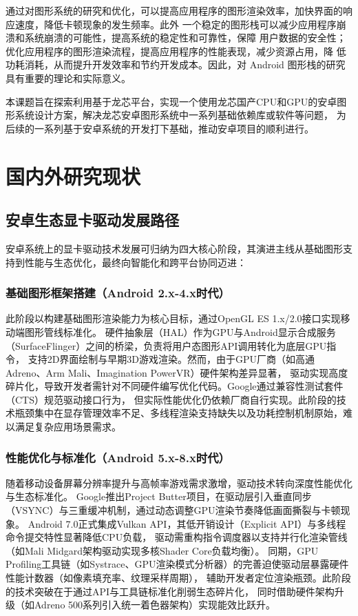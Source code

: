 通过对图形系统的研究和优化，可以提高应用程序的图形渲染效率，加快界面的响应速度，降低卡顿现象的发生频率。此外
一个稳定的图形栈可以减少应用程序崩溃和系统崩溃的可能性，提高系统的稳定性和可靠性，保障
用户数据的安全性；优化应用程序的图形渲染流程，提高应用程序的性能表现，减少资源占用，降
低功耗消耗，从而提升开发效率和节约开发成本。因此，对 Android 图形栈的研究具有重要的理论和实际意义。

本课题旨在探索利用基于龙芯平台，实现一个使用龙芯国产CPU和GPU的安卓图形系统设计方案，解决龙芯安卓图形系统中一系列基础依赖库或软件等问题，
为后续的一系列基于安卓系统的开发打下基础，推动安卓项目的顺利进行。

\section{国内外研究现状}

\subsection{安卓生态显卡驱动发展路径}
安卓系统上的显卡驱动技术发展可归纳为四大核心阶段，其演进主线从基础图形支持到性能与生态优化，最终向智能化和跨平台协同迈进：

\subsubsection{基础图形框架搭建（Android 2.x-4.x时代）}

此阶段以构建基础图形渲染能力为核心目标，通过OpenGL ES 1.x/2.0接口实现移动端图形管线标准化\cite{opengles}。
硬件抽象层（HAL）作为GPU与Android显示合成服务（SurfaceFlinger）之间的桥梁，负责将用户态图形API调用转化为底层GPU指令，
支持2D界面绘制与早期3D游戏渲染。然而，由于GPU厂商（如高通Adreno、Arm Mali\cite{mali}、Imagination PowerVR）硬件架构差异显著，
驱动实现高度碎片化，导致开发者需针对不同硬件编写优化代码。Google通过兼容性测试套件（CTS）规范驱动接口行为，
但实际性能优化仍依赖厂商自行实现。此阶段的技术瓶颈集中在显存管理效率不足、多线程渲染支持缺失以及功耗控制机制原始，难以满足复杂应用场景需求。

\subsubsection{性能优化与标准化（Android 5.x-8.x时代）​}

随着移动设备屏幕分辨率提升与高帧率游戏需求激增，驱动技术转向深度性能优化与生态标准化。
Google推出Project Butter项目，在驱动层引入垂直同步（VSYNC）与三重缓冲机制，通过动态调整GPU渲染节奏降低画面撕裂与卡顿现象\cite{GoogleIO2012}。
Android 7.0正式集成Vulkan API，其低开销设计（Explicit API）与多线程命令提交特性显著降低CPU负载，
驱动需重构指令调度器以支持并行化渲染管线（如Mali Midgard架构驱动实现多核Shader Core负载均衡）\cite{vulkan}。
同期，GPU Profiling工具链\cite{AndroidGPUProfiling}（如Systrace、GPU渲染模式分析器）的完善迫使驱动层暴露硬件性能计数器（如像素填充率、纹理采样周期），
辅助开发者定位渲染瓶颈。此阶段的技术突破在于通过API与工具链标准化削弱生态碎片化，
同时借助硬件架构升级（如Adreno 500系列引入统一着色器架构\cite{adreno}）实现能效比跃升。

